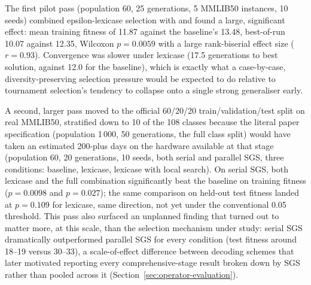 The first pilot pass (population 60, 25 generations, 5 MMLIB50 instances,
10 seeds) combined epsilon-lexicase selection with  and found a large,
significant effect: mean training fitness of 11.87 against the baseline's
13.48, best-of-run 10.07 against 12.35, Wilcoxon $p=0.0059$ with a large
rank-biserial effect size ($r=0.93$). Convergence was slower under lexicase
(17.5 generations to best solution, against 12.0 for the baseline), which
is exactly what a case-by-case, diversity-preserving selection pressure
would be expected to do relative to tournament selection's tendency to
collapse onto a single strong generaliser early.

A second, larger pass moved to the official 60/20/20 train/validation/test
split on real MMLIB50, stratified down to 10 of the 108 classes because the
literal paper specification (population 1\,000, 50 generations, the full
class split) would have taken an estimated 200-plus days on the hardware
available at that stage (population 60, 20 generations, 10 seeds, both
serial and parallel SGS, three conditions: baseline, lexicase, lexicase
with local search).  On serial SGS, both
lexicase and the full combination significantly beat the baseline on
training fitness ($p=0.0098$ and $p=0.027$); the same comparison on
held-out test fitness landed at $p=0.109$ for lexicase, same direction, not
yet under the conventional 0.05 threshold. This pass also surfaced an
unplanned finding that turned out to matter more, at this scale, than the
selection mechanism under study: serial SGS dramatically outperformed
parallel SGS for every condition (test fitness around 18--19 versus 30--33),
a scale-of-effect difference between decoding schemes that later motivated
reporting every comprehensive-stage result broken down by SGS rather than
pooled across it (Section~\ref{sec:operator-evaluation}).

